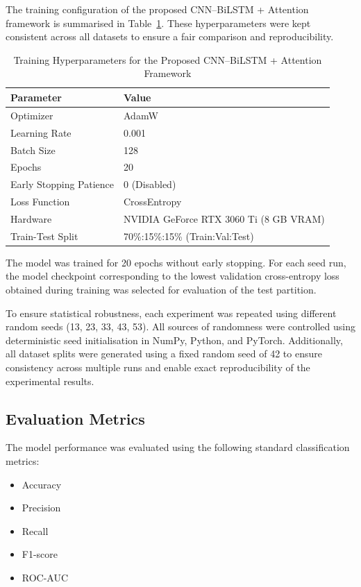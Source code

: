 \documentclass[a4paper,fleqn]{cas-sc}
\begin{document}
The training configuration of the proposed CNN--BiLSTM + Attention framework is summarised in Table~\ref{tab:hyperparams}. These hyperparameters were kept consistent across all datasets to ensure a fair comparison and reproducibility.

\begin{table}
\centering
\caption{Training Hyperparameters for the Proposed CNN--BiLSTM + Attention Framework}
\label{tab:hyperparams}
\begin{tabular}{ll}
\toprule
\textbf{Parameter} & \textbf{Value} \\
\midrule
Optimizer & AdamW \\
Learning Rate & 0.001 \\
Batch Size & 128 \\
Epochs & 20 \\
Early Stopping Patience & 0 (Disabled) \\
Loss Function & CrossEntropy \\
Hardware & NVIDIA GeForce RTX 3060 Ti (8 GB VRAM) \\
Train-Test Split & 70\%:15\%:15\% (Train:Val:Test) \\
\bottomrule
\end{tabular}
\end{table}

The model was trained for 20 epochs without early stopping. For each seed run, the model checkpoint corresponding to the lowest validation cross-entropy loss obtained during training was selected for evaluation of the test partition. 


To ensure statistical robustness, each experiment was repeated using different random seeds (13, 23, 33, 43, 53). All sources of randomness were controlled using deterministic seed initialisation in NumPy, Python, and PyTorch. Additionally, all dataset splits were generated using a fixed random seed of 42 to ensure consistency across multiple runs and enable exact reproducibility of the experimental results.

\subsection{Evaluation Metrics}

The model performance was evaluated using the following standard classification metrics:

\begin{itemize}
    \item Accuracy
    \item Precision
    \item Recall
    \item F1-score
    \item ROC-AUC
\end{itemize}
\end{document}
